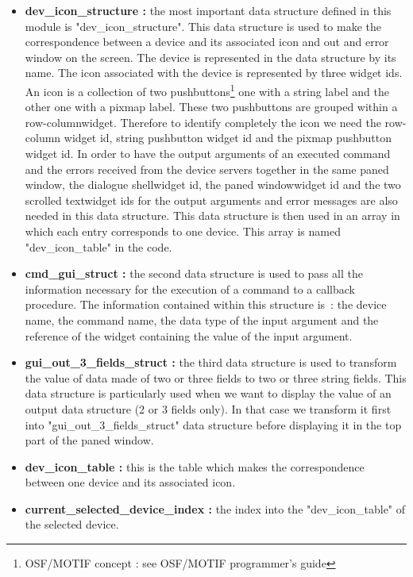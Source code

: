 \begin{itemize}
\item {\bf dev\_icon\_structure : } 
the most important data structure defined in this module is "dev\_icon\_structure". 
This data structure is used to make the correspondence between a device and its 
associated icon and out and error window on the screen. 
The device is represented in the data structure by its name. The icon associated
with the device is represented by three widget ids. An icon is a collection
of two pushbuttons\footnote[1]{OSF/MOTIF concept : see OSF/MOTIF programmer's
guide} one with a string label and the other one with a pixmap
label. These two pushbuttons are grouped within a row-column\footnotemark[1]
widget. Therefore to identify completely the icon we need the row-column widget
id, string pushbutton widget id and the pixmap pushbutton widget id. 
In order to have the output arguments of an executed command and the errors
received from the device servers together in the same paned window\footnotemark[1], 
the dialogue shell\footnotemark[1] widget id, the paned window\footnotemark[1] widget 
id and the two scrolled text\footnotemark[1] widget ids for the
output arguments and error messages are also needed in this data structure.
This data structure is then used in an array in which each entry corresponds to one
device. This array is named "dev\_icon\_table" in the code.

\item {\bf cmd\_gui\_struct : } 
the second data structure is used to pass all the information necessary for the execution 
of a command to a callback procedure.  The information contained within this structure is~: 
the device name, the command name, the data type of the input argument and the reference of 
the widget containing the value of the input argument.

\item {\bf gui\_out\_3\_fields\_struct : } 
the third data structure is used to transform the value of data made of two or three fields 
to two or three string fields. This data structure is particularly used when we want to display the
value of an output data structure (2 or 3 fields only). In that case we
transform it first into "gui\_out\_3\_fields\_struct" data structure before
displaying it in the top part of the paned window.

\item {\bf dev\_icon\_table : } 
this is the table which makes the correspondence between one device and its associated icon.

\item {\bf current\_selected\_device\_index : } 
the index into the "dev\_icon\_table" of the selected device. 
\end{itemize}


